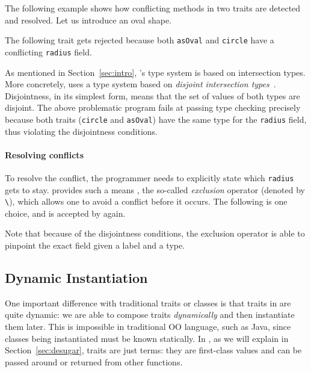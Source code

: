 The following example shows how conflicting methods in two traits are detected
and resolved. Let us introduce an oval shape.

The following trait gets rejected because both \lstinline{asOval} and
\lstinline{circle} have a conflicting \lstinline{radius} field.

\noindent As mentioned in Section~\ref{sec:intro}, \name's type system is based
on intersection types. More concretely, \name uses a type system based on
\emph{disjoint intersection types}~\cite{oliveira2016disjoint}. Disjointness, in
its simplest form, means that the set of values of both types are disjoint. The
above problematic program fails at passing type checking precisely because both
traits (\lstinline{circle} and \lstinline{asOval}) have the same type for the
\lstinline{radius} field, thus violating the disjointness conditions.

\paragraph{Resolving conflicts}
To resolve the conflict, the programmer needs to explicitly state which
\lstinline{radius} gets to stay. \name provides such a means , the so-called
\textit{exclusion} operator (denoted by \lstinline{\}), which allows one to
avoid a conflict before it occurs. The following is one choice, and is accepted
by \name again.

\noindent Note that because of the disjointness conditions, the exclusion
operator is able to pinpoint the exact field given a label and a type.


\subsection{Dynamic Instantiation}

One important difference with traditional traits or classes is that traits in
\name are quite dynamic: we are able to compose traits \textit{dynamically} and
then instantiate them later. This is impossible in traditional OO language, such
as Java, since classes being instantiated must be known statically. In \name, as
we will explain in Section~\ref{sec:desugar}, traits are just terms: they are
first-class values and can be passed around or returned from other functions.

